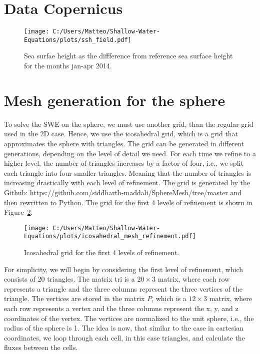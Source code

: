 \section{Data Copernicus}

\begin{figure}[H]
    \centering
    \texttt{[image: C:/Users/Matteo/Shallow-Water-Equations/plots/ssh\_field.pdf]}
    \caption{Sea surfae height as the diffference from reference sea surface height for the months jan-apr 2014.}\label{fig:copernices-ssh}
\end{figure}


\section{Mesh generation for the sphere}
To solve the SWE on the sphere, we must use another grid, than the regular grid used in the 2D case.
Hence, we use the icosahedral grid, which is a grid that approximates the sphere with triangles.
The grid can be generated in different generations, depending on the level of detail we need. 
For each time we refine to a higher level, the number of triangles increases by a factor of four, i.e., we split each triangle into four smaller triangles.
Meaning that the number of triangles is increasing drastically with each level of refinement.
The grid is generated by the Github: https://github.com/siddharth-maddali/SphereMesh/tree/master and then rewritten to Python.
The grid for the first 4 levels of refinement is shown in Figure~\ref{fig:icosahedral_grid}.
\begin{figure}
    \centering
    \texttt{[image: C:/Users/Matteo/Shallow-Water-Equations/plots/icosahedral\_mesh\_refinement.pdf]}
    \caption{Icosahedral grid for the first 4 levels of refinement.}\label{fig:icosahedral_grid}
\end{figure}
For simplicity, we will begin by considering the first level of refinement, which consists of 20 triangles.
The matrix tri is a $20 \times 3$ matrix, where each row represents a triangle and the three columns represent the three vertices of the triangle.
The vertices are stored in the matrix $P$, which is a $12 \times 3$ matrix, where each row represents a vertex and the three columns represent the x, y, and z coordinates of the vertex.
The vertices are normalized to the unit sphere, i.e., the radius of the sphere is 1.
The idea is now, that similar to the case in cartesian coordinates, we loop through each cell, in this case triangles, and calculate the fluxes between the cells.
